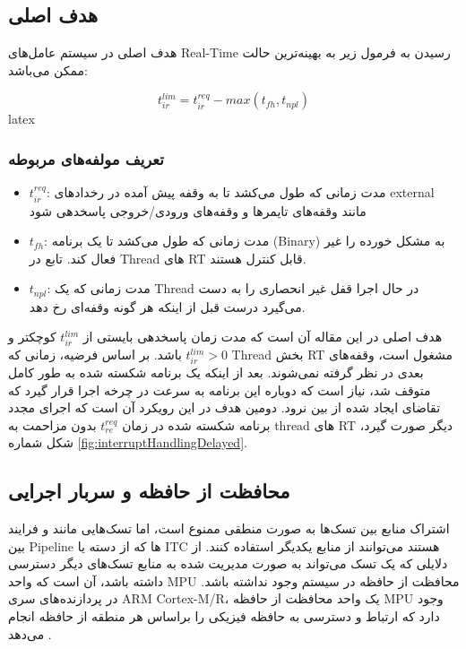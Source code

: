 \documentclass[10pt, a4paper]{article}
\begin{document}
\subsection{هدف اصلی}

هدف اصلی در سیستم عامل‌های Real-Time رسیدن به فرمول زیر به بهینه‌ترین حالت ممکن می‌باشد:

\begin{equation}
    t^{lim}_{ir} = t^{req}_{ir} - max(t_{fh}, t_{npl})
\end{equation}latex

\subsubsection{تعریف مولفه‌های مربوطه}

\begin{itemize}
    \item $t^{req}_{ir}$: مدت زمانی که طول می‌کشد تا به وقفه پیش آمده در
    رخداد‌های external مانند وقفه‌های تایمرها و وقفه‌های ورودی/خروجی پاسخدهی شود
    \item $t_{fh}$: مدت زمانی که طول می‌کشد تا  یک برنامه
    (Binary) به مشکل خورده را غیر فعال کند. تابع  در Thread
    های RT قابل کنترل هستند.
    \item $t_{npl}$: مدت زمانی که یک Thread در حال اجرا قفل غیر انحصاری را به
    دست می‌گیرد درست قبل از اینکه هر گونه وقفه‌ای رخ دهد.
\end{itemize}


هدف اصلی در این مقاله آن است که مدت زمان پاسخدهی بایستی از $t^{lim}_{ir}$ کوچکتر
و $t^{lim}_{ir} > 0$ باشد. بر اساس فرضیه، زمانی که Thread بخش RT مشغول است،
وقفه‌های بعدی در نظر گرفته نمی‌شوند. بعد از اینکه یک برنامه شکسته شده به طور
کامل متوقف شد، نیاز است که دوباره این برنامه به سرعت در چرخه اجرا قرار گیرد که
تقاضای ایجاد شده از بین نرود. دومین هدف در این رویکرد آن است که اجرای مجدد
برنامه شکسته شده در زمان $t^{req}_{re}$ بدون مزاحمت به thread های RT دیگر صورت
گیرد، شکل شماره \ref{fig:interruptHandlingDelayed}.

\subsection{محافظت از حافظه و سربار اجرایی}

اشتراک منابع بین تسک‌ها به صورت منطقی ممنوع است، اما تسک‌هایی مانند  و فرایند بین Pipeline ها که از دسته  یا ITC
هستند می‌توانند از منابع یکدیگر استفاده کنند. از دلایلی که یک تسک می‌تواند به
صورت مدیریت شده به منابع تسک‌های دیگر دسترسی داشته باشد، آن است که واحد MPU
محافظت از حافظه در سیستم وجود نداشته باشد. در پردازنده‌های سری ARM Cortex-M/R،
یک واحد محافظت از حافظه MPU وجود دارد که ارتباط و دسترسی به حافظه فیزیکی را
براساس هر منطقه از حافظه انجام می‌دهد \cite{cortexm4arm}.
\end{document}
